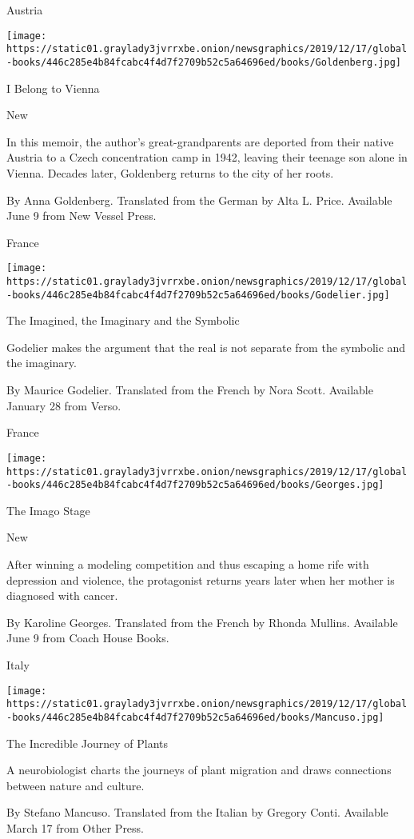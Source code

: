 Austria

\texttt{[image: https://static01.graylady3jvrrxbe.onion/newsgraphics/2019/12/17/global-books/446c285e4b84fcabc4f4d7f2709b52c5a64696ed/books/Goldenberg.jpg]}

I Belong to Vienna

New

In this memoir, the author's great-grandparents are deported from their
native Austria to a Czech concentration camp in 1942, leaving their
teenage son alone in Vienna. Decades later, Goldenberg returns to the
city of her roots.

 By Anna Goldenberg. Translated from the German by Alta L. Price.
Available June 9 from New Vessel Press.

France

\texttt{[image: https://static01.graylady3jvrrxbe.onion/newsgraphics/2019/12/17/global-books/446c285e4b84fcabc4f4d7f2709b52c5a64696ed/books/Godelier.jpg]}

The Imagined, the Imaginary and the Symbolic

Godelier makes the argument that the real is not separate from the
symbolic and the imaginary.

 By Maurice Godelier. Translated from the French by Nora Scott.
Available January 28 from Verso.

France

\texttt{[image: https://static01.graylady3jvrrxbe.onion/newsgraphics/2019/12/17/global-books/446c285e4b84fcabc4f4d7f2709b52c5a64696ed/books/Georges.jpg]}

The Imago Stage

New

After winning a modeling competition and thus escaping a home rife with
depression and violence, the protagonist returns years later when her
mother is diagnosed with cancer.

 By Karoline Georges. Translated from the French by Rhonda Mullins.
Available June 9 from Coach House Books.

Italy

\texttt{[image: https://static01.graylady3jvrrxbe.onion/newsgraphics/2019/12/17/global-books/446c285e4b84fcabc4f4d7f2709b52c5a64696ed/books/Mancuso.jpg]}

The Incredible Journey of Plants

A neurobiologist charts the journeys of plant migration and draws
connections between nature and culture.

 By Stefano Mancuso. Translated from the Italian by Gregory Conti.
Available March 17 from Other Press.

